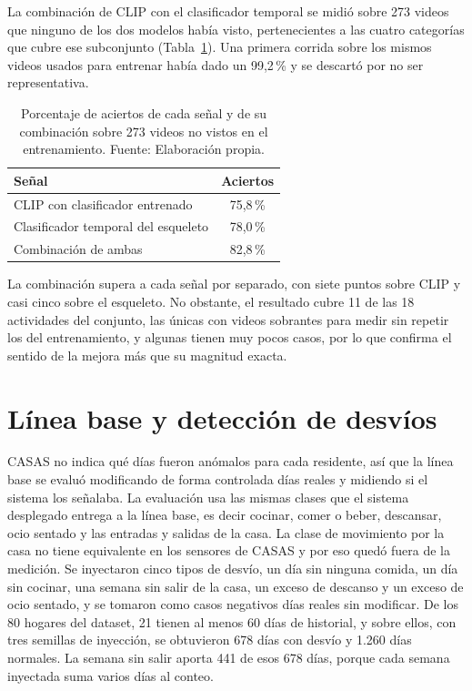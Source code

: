 La combinación de CLIP con el clasificador temporal se midió sobre 273 videos que ninguno de los dos modelos había visto, pertenecientes a las cuatro categorías que cubre ese subconjunto (Tabla~\ref{tab:actividades_fusion}).
Una primera corrida sobre los mismos videos usados para entrenar había dado un 99,2\,\% y se descartó por no ser representativa.

\begin{table}[H]
\centering
\caption[Aciertos de cada señal y de su combinación sobre videos no vistos.]{Porcentaje de aciertos de cada señal y de su combinación sobre 273 videos no vistos en el entrenamiento. Fuente: Elaboración propia.}
\label{tab:actividades_fusion}
\small
\begin{tabular}{@{}lc@{}}
\toprule
\textbf{Señal} & \textbf{Aciertos} \\
\midrule
CLIP con clasificador entrenado & 75,8\,\% \\
Clasificador temporal del esqueleto & 78,0\,\% \\
Combinación de ambas & 82,8\,\% \\
\bottomrule
\end{tabular}
\end{table}

La combinación supera a cada señal por separado, con siete puntos sobre CLIP y casi cinco sobre el esqueleto.
No obstante, el resultado cubre 11 de las 18 actividades del conjunto, las únicas con videos sobrantes para medir sin repetir los del entrenamiento, y algunas tienen muy pocos casos, por lo que confirma el sentido de la mejora más que su magnitud exacta.

\section{Línea base y detección de desvíos}
\label{sec:pruebas_baseline}

CASAS no indica qué días fueron anómalos para cada residente, así que la línea base se evaluó modificando de forma controlada días reales y midiendo si el sistema los señalaba.
La evaluación usa las mismas clases que el sistema desplegado entrega a la línea base, es decir cocinar, comer o beber, descansar, ocio sentado y las entradas y salidas de la casa.
La clase de movimiento por la casa no tiene equivalente en los sensores de CASAS y por eso quedó fuera de la medición.
Se inyectaron cinco tipos de desvío, un día sin ninguna comida, un día sin cocinar, una semana sin salir de la casa, un exceso de descanso y un exceso de ocio sentado, y se tomaron como casos negativos días reales sin modificar.
De los 80 hogares del dataset, 21 tienen al menos 60 días de historial, y sobre ellos, con tres semillas de inyección, se obtuvieron 678 días con desvío y 1.260 días normales.
La semana sin salir aporta 441 de esos 678 días, porque cada semana inyectada suma varios días al conteo.

